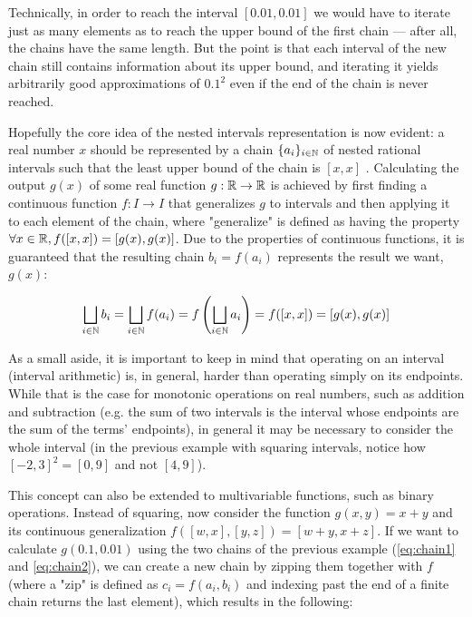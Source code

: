 Technically, in order to reach the interval $[0.01, 0.01]$ we would have to iterate just as many elements as to reach the upper bound of the first chain --- after all, the chains have the same length. But the point is that each interval of the new chain still contains information about its upper bound, and iterating it yields arbitrarily good approximations of $0.1^2$ even if the end of the chain is never reached.

Hopefully the core idea of the nested intervals representation is now evident: a real number $x$ should be represented by a chain $\{a_i\}_{i \in \mathbb{N}}$ of nested rational intervals such that the least upper bound of the chain is $[x,x]$ \cite{BAUER2009251}. Calculating the output $g(x)$ of some real function $g: \mathbb{R} \rightarrow \mathbb{R}$ is achieved by first finding a continuous function $f: I \rightarrow I$ that generalizes $g$ to intervals and then applying it to each element of the chain, where "generalize" is defined as having the property $\forall x \in \mathbb{R}, f([x,x])=[g(x),g(x)]$. Due to the properties of continuous functions, it is guaranteed that the resulting chain $b_i = f(a_i)$ represents the result we want, $g(x)$:

\begin{equation}
\label{eq:fg_equivalence}
  \bigsqcup_{\substack{i \in \mathbb{N}}} b_i = \bigsqcup_{\substack{i \in \mathbb{N}}} f(a_i) = f \left(\bigsqcup_{\substack{i \in \mathbb{N}}} a_i \right) = f([x,x]) = [g(x), g(x)]
\end{equation}

As a small aside, it is important to keep in mind that operating on an interval (interval arithmetic) is, in general, harder than operating simply on its endpoints. While that is the case for monotonic operations on real numbers, such as addition and subtraction (e.g. the sum of two intervals is the interval whose endpoints are the sum of the terms' endpoints), in general it may be necessary to consider the whole interval (in the previous example with squaring intervals, notice how $[-2, 3]^2 = [0, 9]$ and not $[4, 9]$).

This concept can also be extended to multivariable functions, such as binary operations. Instead of squaring, now consider the function $g(x,y) = x + y$ and its continuous generalization $f([w,x],[y,z]) = [w+y,x+z]$. If we want to calculate $g(0.1, 0.01)$ using the two chains of the previous example (\cref{eq:chain1} and \cref{eq:chain2}), we can create a new chain by zipping them together with $f$ (where a "zip" is defined as $c_i = f(a_i, b_i)$ and indexing past the end of a finite chain returns the last element), which results in the following:

